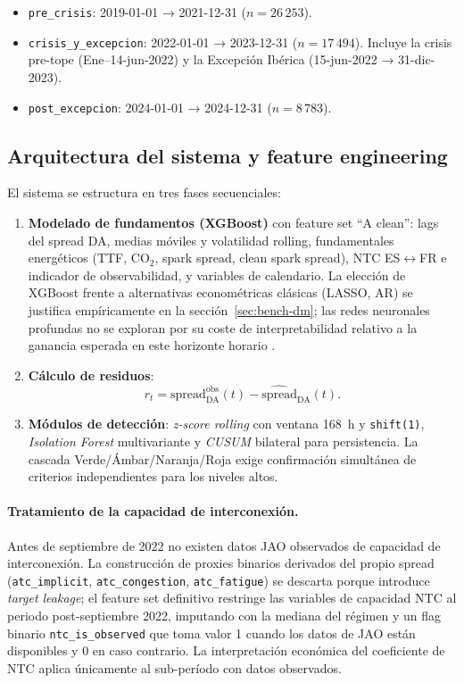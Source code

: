 \documentclass[11pt,a4paper]{article}
\begin{document}
\begin{itemize}
\item \texttt{pre\_crisis}: 2019-01-01 → 2021-12-31 ($n = 26\,253$).
\item \texttt{crisis\_y\_excepcion}: 2022-01-01 → 2023-12-31 ($n = 17\,494$).
   Incluye la crisis pre-tope (Ene--14-jun-2022) y la Excepción Ibérica
   (15-jun-2022 → 31-dic-2023).
\item \texttt{post\_excepcion}: 2024-01-01 → 2024-12-31 ($n = 8\,783$).
\end{itemize}

\subsection{Arquitectura del sistema y feature engineering}\label{sec:arch}

El sistema se estructura en tres fases secuenciales:

\begin{enumerate}
\item \textbf{Modelado de fundamentos (XGBoost)} con feature set
``A clean'': lags del spread DA, medias móviles y volatilidad rolling,
fundamentales energéticos (TTF, CO$_2$, spark spread, clean spark spread),
NTC ES$\leftrightarrow$FR e indicador de observabilidad, y variables de
calendario. La elección de XGBoost frente a alternativas econométricas
clásicas (LASSO, AR) se justifica empíricamente en la
sección~\ref{sec:bench-dm}; las redes neuronales profundas no se
exploran por su coste de interpretabilidad relativo a la ganancia
esperada en este horizonte horario \citep{Lago2018, Lago2021}.

\item \textbf{Cálculo de residuos}:
\[
r_t = \mathrm{spread}_\text{DA}^\text{obs}(t) - \widehat{\mathrm{spread}}_\text{DA}(t).
\]

\item \textbf{Módulos de detección}: \textit{z-score rolling} con
ventana 168~h y \texttt{shift(1)}, \emph{Isolation Forest} multivariante
y \emph{CUSUM} bilateral para persistencia. La cascada
Verde/Ámbar/Naranja/Roja exige confirmación simultánea de criterios
independientes para los niveles altos.
\end{enumerate}

\paragraph{Tratamiento de la capacidad de interconexión.}
Antes de septiembre de 2022 no existen datos JAO observados de
capacidad de interconexión. La construcción de proxies binarios
derivados del propio spread (\texttt{atc\_implicit},
\texttt{atc\_congestion}, \texttt{atc\_fatigue}) se descarta porque
introduce \emph{target leakage}; el feature set definitivo restringe
las variables de capacidad NTC al periodo post-septiembre 2022,
imputando con la mediana del régimen y un flag binario
\texttt{ntc\_is\_observed} que toma valor 1 cuando los datos de JAO
están disponibles y 0 en caso contrario. La interpretación económica
del coeficiente de NTC aplica únicamente al sub-período con datos
observados.
\end{document}

